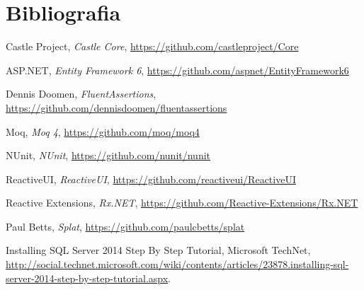 \documentclass[10pt,a4paper]{article}
\begin{document}
\section{Bibliografia}
\begin{thebibliography}{99}

	Castle Project,
	\emph{Castle Core},
	\url{https://github.com/castleproject/Core}

	ASP.NET,
	\emph{Entity Framework 6},
	\url{https://github.com/aspnet/EntityFramework6}

	Dennis Doomen,
	\emph{FluentAssertions},
	\url{https://github.com/dennisdoomen/fluentassertions}

	Moq,
	\emph{Moq 4},
	\url{https://github.com/moq/moq4}

	NUnit,
	\emph{NUnit},
	\url{https://github.com/nunit/nunit}

	ReactiveUI,
	\emph{ReactiveUI},
	\url{https://github.com/reactiveui/ReactiveUI}

	Reactive Extensions,
	\emph{Rx.NET},
	\url{https://github.com/Reactive-Extensions/Rx.NET}

	Paul Betts,
	\emph{Splat},
	\url{https://github.com/paulcbetts/splat}

	Installing SQL Server 2014 Step By Step Tutorial,
	Microsoft TechNet,
	\url{http://social.technet.microsoft.com/wiki/contents/articles/23878.installing-sql-server-2014-step-by-step-tutorial.aspx}.

\end{thebibliography}
\end{document}
